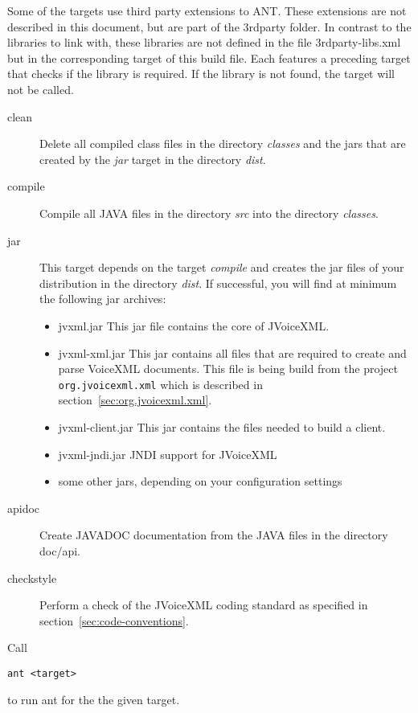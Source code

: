\documentclass[11pt,a4paper]{article}
\begin{document}
Some of the targets use third party extensions to ANT. These 
extensions are not described in this document, but are part of
the 3rdparty folder. In contrast to the libraries to link with,
these libraries are not defined in the file 3rdparty-libs.xml
but in the corresponding target of this build file. Each features
a preceding target that checks if the library is required. If
the library is not found, the target will not be called.

\begin{description}
\item[clean]
Delete all compiled class files in the directory \emph{classes}
and the jars that are created by the \emph{jar} target in the directory 
\emph{dist}.

\item[compile]
 Compile all JAVA files in the directory \emph{src} into the directory
\emph{classes}.

\item[jar]
 This target depends on the target \emph{compile} and creates the jar
files of your distribution in the directory \emph{dist}.
If successful, you will find at minimum the following jar archives:
\begin{itemize}
\item jvxml.jar This jar file contains the core of JVoiceXML.
\item jvxml-xml.jar This jar contains all files that are required
to create and parse VoiceXML documents. This file is being build from the
project \lstinline{org.jvoicexml.xml} which is described in
section~\ref{sec:org.jvoicexml.xml}.
\item jvxml-client.jar This jar contains the files needed to build
a client.
\item jvxml-jndi.jar JNDI support for JVoiceXML
\item some other jars, depending on your configuration settings
\end{itemize}

\item[apidoc]
Create JAVADOC documentation from the JAVA files in the directory
doc/api.
\item[checkstyle]
Perform a check of the JVoiceXML coding standard as specified 
in section~\ref{sec:code-conventions}.
\end{description}

Call
\begin{lstlisting}
ant <target>
\end{lstlisting}
to run ant for the the given target.
\end{document}
